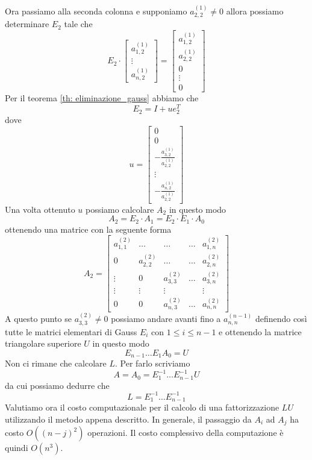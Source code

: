 Ora passiamo alla seconda colonna e supponiamo $a_{2,2}^{(1)} \neq 0$ allora possiamo determinare $E_2$ tale che
\[
	E_2 \cdot \begin{bmatrix}
		a_{1,2}^{(1)} \\ \vdots \\ a_{n,2}^{(1)}
	\end{bmatrix} =
	\begin{bmatrix}
		a_{1,2}^{(1)} \\ a_{2,2}^{(1)} \\ 0 \\ \vdots \\ 0
	\end{bmatrix}
\]
Per il teorema \ref{th: eliminazione_gauss} abbiamo che
\[ E_2 = I + u e_2^T \]
dove
\[
	u = \begin{bmatrix}
		0 \\ 0 \\ -\frac{a_{3,2}^{(1)}}{a_{2,2}^{(1)}} \\ \vdots \\ -\frac{a_{n,2}^{(1)}}{a_{2,2}^{(1)}}
	\end{bmatrix}
\]
Una volta ottenuto $u$ possiamo calcolare $A_2$ in questo modo
\[ A_2 = E_2 \cdot A_1 = E_2 \cdot E_1 \cdot A_0 \]
ottenendo una matrice con la seguente forma
\[
	A_2 = \begin{bmatrix}
		a_{1,1}^{(2)} & \dots         & \dots         & \dots & a_{1,n}^{(2)} \\
		0             & a_{2,2}^{(2)} & \dots         & \dots & a_{2,n}^{(2)} \\
		\vdots        & 0             & a_{3,3}^{(2)} & \dots & a_{3,n}^{(2)} \\
		\vdots        & \vdots        & \vdots        &       & \vdots        \\
		0             & 0             & a_{n,3}^{(2)} & \dots & a_{n,n}^{(2)}
	\end{bmatrix}
\]
A questo punto se $a_{3,3}^{(2)} \neq 0$ possiamo andare avanti fino a $a_{n,n}^{(n-1)}$ definendo così tutte
le matrici elementari di Gauss $E_i$ con $1 \leq i \leq n-1$ e ottenendo la matrice triangolare superiore $U$
in questo modo
\[ E_{n-1} \dots E_1 A_0 = U \]
Non ci rimane che calcolare $L$. Per farlo scriviamo
\[ A = A_0 = E_1^{-1} \dots E_{n-1}^{-1} U \]
da cui possiamo dedurre che
\[ L = E_1^{-1} \dots E_{n-1}^{-1} \]
Valutiamo ora il costo computazionale per il calcolo di una fattorizzazione $LU$ utilizzando il metodo appena
descritto. In generale, il passaggio da $A_i$ ad $A_j$ ha costo $O((n-j)^2)$ operazioni. Il costo complessivo
della computazione è quindi $O(n^3)$.

